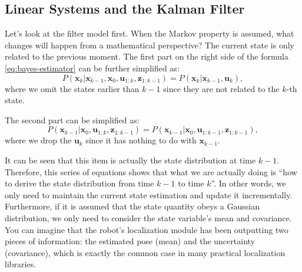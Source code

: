 \subsection{Linear Systems and the Kalman Filter}
Let's look at the filter model first. When the Markov property is assumed, what changes will happen from a mathematical perspective? The current state is only related to the previous moment. The first part on the right side of the formula \eqref{eq:bayes-estimator} can be further simplified as:
\begin{equation}
	P\left( {{\mathbf{x}_k}|{\mathbf{x}_{k - 1}},{\mathbf{x}_0},{\mathbf{u}_{1:k}},{\mathbf{z}_{1:k - 1}}} \right) = P\left( {{\mathbf{x}_k}|{\mathbf{x}_{k - 1}},{\mathbf{u}_k}} \right),
\end{equation}
where we omit the states earlier than $k-1$ since they are not related to the $k$-th state. 

The second part can be simplified as: 
\begin{equation}
	P\left( {{\mathbf{x}_{k - 1}}|{\mathbf{x}_0},{\mathbf{u}_{1:k}},{\mathbf{z}_{1:k - 1}}} \right) = P\left( {{\mathbf{x}_{k - 1}}|{\mathbf{x}_0},{\mathbf{u}_{1:k - 1}},{\mathbf{z}_{1:k - 1}}} \right),
\end{equation}
where we drop the $\mathbf{u}_k$ since it has nothing to do with $\mathbf{x}_{k-1}$. 

It can be seen that this item is actually the state distribution at time $k-1$. Therefore, this series of equations shows that what we are actually doing is ``how to derive the state distribution from time $k-1$ to time $k$''. In other words, we only need to maintain the current state estimation and update it incrementally. Furthermore, if it is assumed that the state quantity obeys a Gaussian distribution, we only need to consider the state variable's mean and covariance. You can imagine that the robot's localization module has been outputting two pieces of information: the estimated pose (mean) and the uncertainty (covariance), which is exactly the common case in many practical localization libraries.

